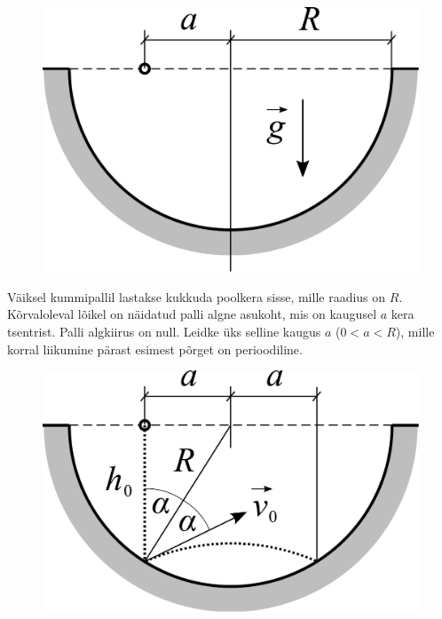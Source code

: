 
\begin{figure}
\vspace{-25pt}
  \begin{center}
    \includegraphics[width=\linewidth]{2024-v2g-10-yl.pdf}
  \end{center}
  \vspace{-1cm}
\end{figure}

Väiksel kummipallil lastakse kukkuda poolkera sisse, mille raadius on $R$. Kõrvaloleval lõikel on näidatud palli algne asukoht, mis on kaugusel $a$ kera tsentrist. Palli algkiirus on null. Leidke üks selline kaugus $a$ ($0<a<R$), mille korral liikumine pärast esimest põrget on perioodiline.


\hint

\solu
\begin{figure}
\vspace{-1.1cm}
  \begin{center}
    \includegraphics[width=1\linewidth]{2024-v2g-10-yl1.pdf}
  \end{center}
  \vspace{-1cm}
\end{figure}

